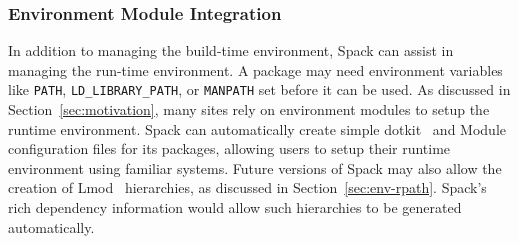 \subsubsection{Environment Module Integration}
\label{sec:envmodule}
In addition to managing the build-time environment, Spack can assist in managing
the run-time environment.  A package may need environment variables like {\tt PATH}, 
{\tt LD_LIBRARY_PATH}, or {\tt MANPATH} set before it can be used.  
As discussed in Section~\ref{sec:motivation}, many sites rely on environment 
modules to setup the runtime environment.  Spack can automatically create simple
dotkit~\cite{dotkit} and Module configuration files for its packages, allowing 
users to setup their runtime environment using familiar systems.  
%
Future versions of Spack may also allow the creation of Lmod~\cite{mclay:lmod} 
hierarchies, as discussed in Section~\ref{sec:env-rpath}. Spack's rich 
dependency information would allow such hierarchies to be generated automatically.














